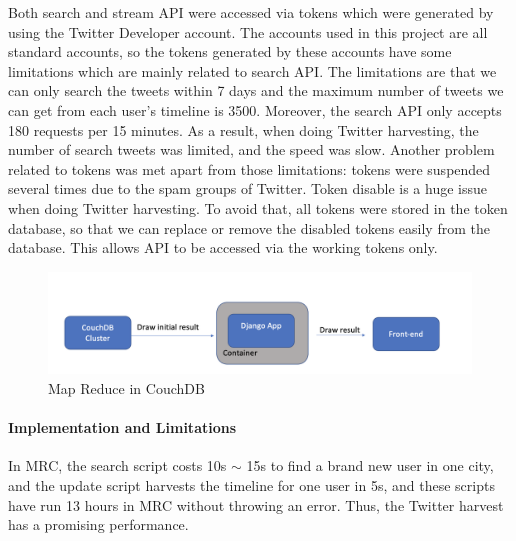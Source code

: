 Both search and stream API were accessed via tokens which were generated by using the Twitter Developer account. The accounts used in this project are all standard accounts, so the tokens generated by these accounts have some limitations which are mainly related to search API. The limitations are that we can only search the tweets within 7 days and the maximum number of tweets we can get from each user's timeline is 3500. Moreover, the search API only accepts 180 requests per 15 minutes. As a result, when doing Twitter harvesting, the number of search tweets was limited, and the speed was slow. Another problem related to tokens was met apart from those limitations: tokens were suspended several times due to the spam groups of Twitter. Token disable is a huge issue when doing Twitter harvesting. To avoid that, all tokens were stored in the token database, so that we can replace or remove the disabled tokens easily from the database. This allows API to be accessed via the working tokens only.

\begin{figure}
\centerline{\includegraphics[width=6in]{Figures/couchdb-django.png}}
\caption{Map Reduce in CouchDB \label{couchdb and django}}
\end{figure}
\paragraph{Implementation and Limitations}

In MRC, the search script costs 10s $\sim$ 15s to find a brand new user in one city, and the update script harvests the timeline for one user in 5s, and these scripts have run 13 hours in MRC without throwing an error. Thus, the Twitter harvest has a promising performance. 

